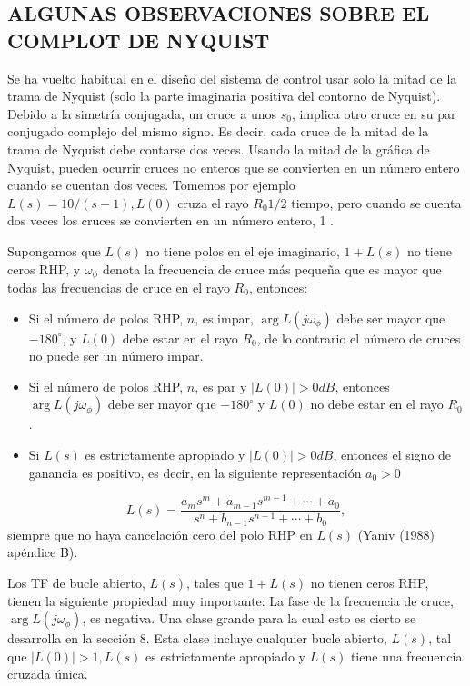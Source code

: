 \subsection{ALGUNAS OBSERVACIONES SOBRE EL COMPLOT DE NYQUIST}
Se ha vuelto habitual en el diseño del sistema de control usar solo la mitad de la trama de Nyquist (solo la parte imaginaria positiva del contorno de Nyquist). Debido a la simetría conjugada, un cruce a unos $s_{0}$, implica otro cruce en su par conjugado complejo del mismo signo. Es decir, cada cruce de la mitad de la trama de Nyquist debe contarse dos veces. Usando la mitad de la gráfica de Nyquist, pueden ocurrir cruces no enteros que se convierten en un número entero cuando se cuentan dos veces. Tomemos por ejemplo $L(s)=10 /(s-1), L(0)$ cruza el rayo $R_{0} 1 / 2$ tiempo, pero cuando se cuenta dos veces los cruces se convierten en un número entero, 1 .

Supongamos que $L(s)$ no tiene polos en el eje imaginario, $1+L(s)$ no tiene ceros RHP, y $\omega_{\phi}$ denota la frecuencia de cruce más pequeña que es mayor que todas las frecuencias de cruce en el rayo $R_{0}$, entonces:

\begin{itemize}
  \item Si el número de polos RHP, $n$, es impar, $\arg L\left(j \omega_{\phi}\right)$ debe ser mayor que $-180^{\circ}$, y $L(0)$ debe estar en el rayo $R_{0}$, de lo contrario el número de cruces no puede ser un número impar.

  \item Si el número de polos RHP, $n$, es par y $| L(0)|>0 d B$, entonces $\arg L\left(j \omega_{\phi}\right)$ debe ser mayor que $-180^{\circ}$ y $L(0)$ no debe estar en el rayo $R_{0}$.

  \item Si $L(s)$ es estrictamente apropiado y $| L(0)|>0 d B$, entonces el signo de ganancia es positivo, es decir, en la siguiente representación $a_{0}>0$

\end{itemize}
$$
L(s)=\frac{a_{m} s^{m}+a_{m-1} s^{m-1}+\cdots+a_{0}}{s^{n}+b_{n-1} s^{n-1}+\cdots+b_{0}},
$$
siempre que no haya cancelación cero del polo RHP en $L(s)$ (Yaniv (1988) apéndice B).

Los TF de bucle abierto, $L(s)$, tales que $1+L(s)$ no tienen ceros RHP, tienen la siguiente propiedad muy importante: La fase de la frecuencia de cruce, $\arg L\left(j \omega_{\phi}\right)$, es negativa. Una clase grande para la cual esto es cierto se desarrolla en la sección 8. Esta clase incluye cualquier bucle abierto, $L(s)$, tal que $| L(0)|>1, L(s)$ es estrictamente apropiado y $L(s)$ tiene una frecuencia cruzada única.


